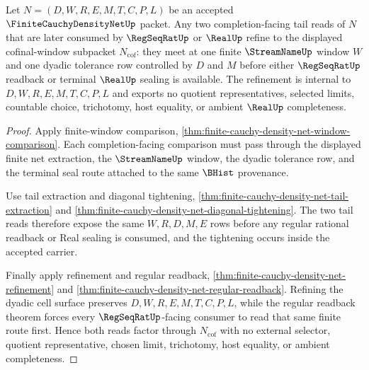 \begin{theorem}
\label{thm:finite-cauchy-density-net-cofinal-window}
Let $N=(D,W,R,E,M,T,C,P,L)$ be an accepted $\FiniteCauchyDensityNetUp$ packet. Any two completion-facing tail reads of $N$ that are later consumed by $\RegSeqRatUp$ or $\RealUp$ refine to the displayed cofinal-window subpacket $N_{\mathrm{cof}}$: they meet at one finite $\StreamNameUp$ window $W$ and one dyadic tolerance row controlled by $D$ and $M$ before either $\RegSeqRatUp$ readback or terminal $\RealUp$ sealing is available. The refinement is internal to $D,W,R,E,M,T,C,P,L$ and exports no quotient representatives, selected limits, countable choice, trichotomy, host equality, or ambient $\RealUp$ completeness.
\end{theorem}
\begin{proof}
Apply finite-window comparison, \autoref{thm:finite-cauchy-density-net-window-comparison}. Each completion-facing comparison must pass through the displayed finite net extraction, the $\StreamNameUp$ window, the dyadic tolerance row, and the terminal seal route attached to the same $\BHist$ provenance.

Use tail extraction and diagonal tightening, \autoref{thm:finite-cauchy-density-net-tail-extraction} and \autoref{thm:finite-cauchy-density-net-diagonal-tightening}. The two tail reads therefore expose the same $W,R,D,M,E$ rows before any regular rational readback or Real sealing is consumed, and the tightening occurs inside the accepted carrier.

Finally apply refinement and regular readback, \autoref{thm:finite-cauchy-density-net-refinement} and \autoref{thm:finite-cauchy-density-net-regular-readback}. Refining the dyadic cell surface preserves $D,W,R,E,M,T,C,P,L$, while the regular readback theorem forces every $\RegSeqRatUp$-facing consumer to read that same finite route first. Hence both reads factor through $N_{\mathrm{cof}}$ with no external selector, quotient representative, chosen limit, trichotomy, host equality, or ambient completeness.
\end{proof}

